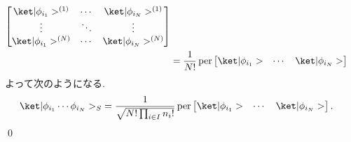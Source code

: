 \documentclass[uplatex,dvipdfmx,a4paper,11pt]{jlreq}
\makeatletter
\DeclareMathOperator{\per}{per}
\numberwithin{equation}{section}
\theoremstyle{definition}
\renewenvironment{proof}[1][\proofname]{\par
  \normalfont
  \topsep6\p@\@plus6\p@ \trivlist
  \item[\hskip\labelsep{\bfseries #1}\@addpunct{\bfseries}]\ignorespaces\quad\par
}{%
  \qed\endtrivlist\@endpefalse
}
\renewcommand\proofname{証明}
\makeatother
\begin{document}
\begin{proof}
\begin{align}
\begin{bmatrix}
                                                                               \ket|\phi_{i_1}>^{(1)} & \cdots & \ket|\phi_{i_N}>^{(1)} \\
                                                                               \vdots                 & \ddots & \vdots                 \\
                                                                               \ket|\phi_{i_1}>^{(N)} & \cdots & \ket|\phi_{i_N}>^{(N)}
                                                                             \end{bmatrix}                                           \\
                                                         & = \frac{1}{N!}\per\begin{bmatrix}\ket|\phi_{i_1}> & \cdots & \ket|\phi_{i_N}>\end{bmatrix}
  \end{align}
  よって次のようになる.
  \begin{align}
    \ket|\phi_{i_1}\cdots\phi_{i_N}>_S & = \frac{1}{\sqrt{N!\prod_{i\in I}n_i!}}\per\begin{bmatrix}\ket|\phi_{i_1}> & \cdots & \ket|\phi_{i_N}>\end{bmatrix}.
  \end{align}
\end{proof}
\end{document}

